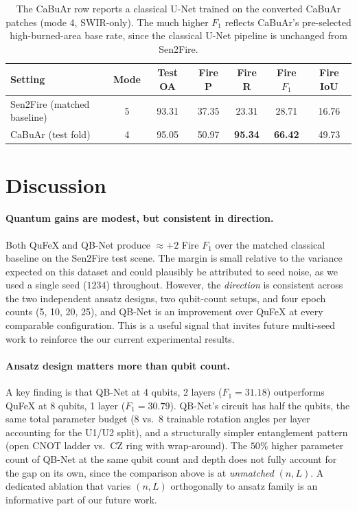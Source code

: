 \documentclass{article}
\begin{document}
\begin{table}[H]
    \centering
    \begin{tabular}{lcccccc}
        \toprule
        Setting & Mode & Test OA & Fire P & Fire R & Fire $F_1$ & Fire IoU \\
        \midrule
        Sen2Fire (matched baseline) & 5 & 93.31 & 37.35 & 23.31 & 28.71 & 16.76 \\
        CaBuAr (test fold)          & 4 & 95.05 & 50.97 & \textbf{95.34} & \textbf{66.42} & 49.73 \\
        \bottomrule
    \end{tabular}
    \caption{The CaBuAr row reports a classical U-Net trained on the converted CaBuAr patches (mode 4, SWIR-only). The much higher $F_1$ reflects CaBuAr's pre-selected high-burned-area base rate, since the classical U-Net pipeline is unchanged from Sen2Fire.}
    \label{tab:cabuar}
\end{table}



\section{Discussion}
\label{sec:discussion}

\paragraph{Quantum gains are modest, but consistent in direction.} Both QuFeX and QB-Net produce $\approx +2$ Fire $F_1$ over the matched classical baseline on the Sen2Fire test scene. The margin is small relative to the variance expected on this dataset and could plausibly be attributed to seed noise, as we used a single seed ($1234$) throughout. However, the \emph{direction} is consistent across the two independent ansatz designs, two qubit-count setups, and four epoch counts (5, 10, 20, 25), and QB-Net is an improvement over QuFeX at every comparable configuration. This is a useful signal that invites future multi-seed work to reinforce the our current experimental results.

\paragraph{Ansatz design matters more than qubit count.} A key finding is that QB-Net at 4 qubits, 2 layers ($F_1 = 31.18$) outperforms QuFeX at 8 qubits, 1 layer ($F_1 = 30.79$). QB-Net's circuit has half the qubits, the same total parameter budget (8 vs.\ 8 trainable rotation angles per layer accounting for the U1/U2 split), and a structurally simpler entanglement pattern (open CNOT ladder vs.\ CZ ring with wrap-around). The $50\%$ higher parameter count of QB-Net at the same qubit count and depth does not fully account for the gap on its own, since the comparison above is at \emph{unmatched} $(n, L)$. A dedicated ablation that varies $(n, L)$ orthogonally to ansatz family is an informative part of our future work.
\end{document}

